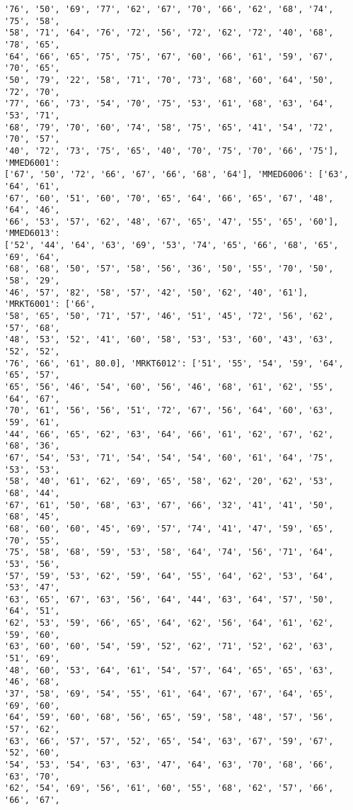\documentclass[11pt]{article}
\begin{document}
\begin{Verbatim}[commandchars=\\\{\}]
'76', '50', '69', '77', '62', '67', '70', '66', '62', '68', '74', '75', '58',
'58', '71', '64', '76', '72', '56', '72', '62', '72', '40', '68', '78', '65',
'64', '66', '65', '75', '75', '67', '60', '66', '61', '59', '67', '70', '65',
'50', '79', '22', '58', '71', '70', '73', '68', '60', '64', '50', '72', '70',
'77', '66', '73', '54', '70', '75', '53', '61', '68', '63', '64', '53', '71',
'68', '79', '70', '60', '74', '58', '75', '65', '41', '54', '72', '70', '57',
'40', '72', '73', '75', '65', '40', '70', '75', '70', '66', '75'], 'MMED6001':
['67', '50', '72', '66', '67', '66', '68', '64'], 'MMED6006': ['63', '64', '61',
'67', '60', '51', '60', '70', '65', '64', '66', '65', '67', '48', '64', '46',
'66', '53', '57', '62', '48', '67', '65', '47', '55', '65', '60'], 'MMED6013':
['52', '44', '64', '63', '69', '53', '74', '65', '66', '68', '65', '69', '64',
'68', '68', '50', '57', '58', '56', '36', '50', '55', '70', '50', '58', '29',
'46', '57', '82', '58', '57', '42', '50', '62', '40', '61'], 'MRKT6001': ['66',
'58', '65', '50', '71', '57', '46', '51', '45', '72', '56', '62', '57', '68',
'48', '53', '52', '41', '60', '58', '53', '53', '60', '43', '63', '52', '52',
'76', '66', '61', 80.0], 'MRKT6012': ['51', '55', '54', '59', '64', '65', '57',
'65', '56', '46', '54', '60', '56', '46', '68', '61', '62', '55', '64', '67',
'70', '61', '56', '56', '51', '72', '67', '56', '64', '60', '63', '59', '61',
'44', '66', '65', '62', '63', '64', '66', '61', '62', '67', '62', '68', '36',
'67', '54', '53', '71', '54', '54', '54', '60', '61', '64', '75', '53', '53',
'58', '40', '61', '62', '69', '65', '58', '62', '20', '62', '53', '68', '44',
'67', '61', '50', '68', '63', '67', '66', '32', '41', '41', '50', '68', '45',
'68', '60', '60', '45', '69', '57', '74', '41', '47', '59', '65', '70', '55',
'75', '58', '68', '59', '53', '58', '64', '74', '56', '71', '64', '53', '56',
'57', '59', '53', '62', '59', '64', '55', '64', '62', '53', '64', '53', '47',
'63', '65', '67', '63', '56', '64', '44', '63', '64', '57', '50', '64', '51',
'62', '53', '59', '66', '65', '64', '62', '56', '64', '61', '62', '59', '60',
'63', '60', '60', '54', '59', '52', '62', '71', '52', '62', '63', '51', '69',
'48', '60', '53', '64', '61', '54', '57', '64', '65', '65', '63', '46', '68',
'37', '58', '69', '54', '55', '61', '64', '67', '67', '64', '65', '69', '60',
'64', '59', '60', '68', '56', '65', '59', '58', '48', '57', '56', '57', '62',
'63', '66', '57', '57', '52', '65', '54', '63', '67', '59', '67', '52', '60',
'54', '53', '54', '63', '63', '47', '64', '63', '70', '68', '66', '63', '70',
'62', '54', '69', '56', '61', '60', '55', '68', '62', '57', '66', '66', '67',

\end{Verbatim}
\end{document}
